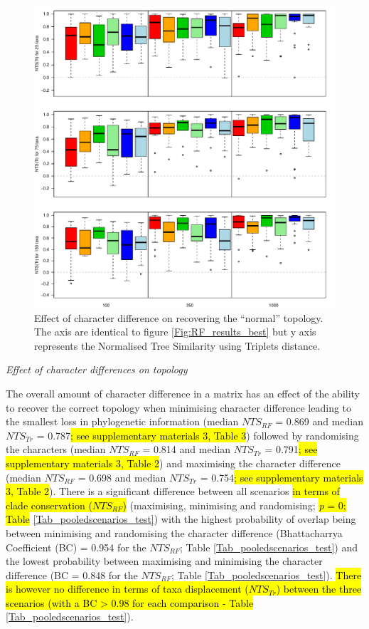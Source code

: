 \documentclass[12pt,letterpaper]{article}
\renewcommand{\subsection}[1]{%
\bigskip
\begin{center}
\begin{large}
\normalfont\itshape #1
\end{large}
\end{center}}
\begin{document}
\begin{figure}[!htbp]
\centering
   \includegraphics[width=1\textwidth]{Figures/Tr_results_best.pdf}
\caption{Effect of character difference on recovering the ``normal'' topology. The axis are identical to figure \ref{Fig:RF_results_best} but y axis represents the Normalised Tree Similarity using Triplets distance.}
\label{Fig:Tr_results_best}
\end{figure}

\subsection{Effect of character differences on topology}

The overall amount of character difference in a matrix has an effect of the ability to recover the correct topology when minimising character difference leading to the smallest loss in phylogenetic information (median $NTS_{RF}$ = 0.869 and median $NTS_{Tr}$ = 0.787\hl{; see supplementary materials 3, Table 3}) followed by randomising the characters (median $NTS_{RF}$ = 0.814 and median $NTS_{Tr}$ = 0.791\hl{; see supplementary materials 3, Table 2}) and maximising the character difference (median $NTS_{RF}$ = 0.698 and median $NTS_{Tr}$ = 0.754\hl{; see supplementary materials 3, Table 2}).
There is a significant difference between all scenarios \hl{in terms of clade conservation ($NTS_{RF}$)} (maximising, minimising and randomising; \hl{\textit{p} = 0; Table} \ref{Tab_pooledscenarios_test}) with the highest probability of overlap being between minimising and randomising the character difference (Bhattacharrya Coefficient (BC) = 0.954 for the $NTS_{RF}$; Table \ref{Tab_pooledscenarios_test}) and the lowest probability between maximising and minimising the character difference (BC = 0.848 for the $NTS_{RF}$; Table \ref{Tab_pooledscenarios_test}).
\hl{There is however no difference in terms of taxa displacement ($NTS_{Tr}$) between the three scenarios (with a BC > 0.98 for each comparison - Table}
\ref{Tab_pooledscenarios_test}).
\end{document}
